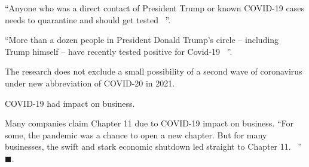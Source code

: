 \enquote{Anyone who was a direct contact of President Trump or known COVID-19 cases needs to quarantine and should get tested ~\cite{mn-100220}}.

\enquote{More than a dozen people in President Donald Trump's circle -- including Trump himself -- have recently tested positive for Covid-19 ~\cite{cnn-20201004}}.

The research does not exclude a small possibility of a second wave of coronavirus under new abbreviation of COVID-20 in 2021.

COVID-19 had impact on business.

Many companies claim Chapter 11 due to COVID-19 impact on business. \enquote{For some, the pandemic was a chance to open a new chapter. But for many businesses, the swift and stark economic shutdown led straight to Chapter 11.  ~\cite{fortune-20200804}} $\blacksquare$.



